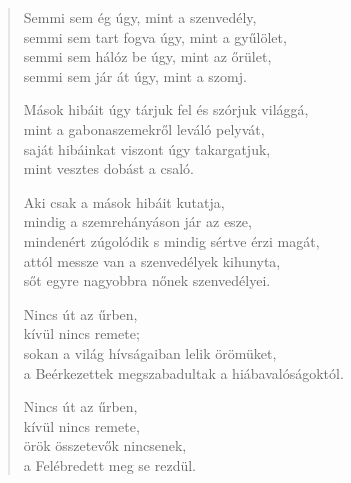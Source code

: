 \begin{verse}
 Semmi sem ég úgy, mint a szenvedély,\\
semmi sem tart fogva úgy, mint a gyűlölet,\\
semmi sem hálóz be úgy, mint az őrület,\\
semmi sem jár át úgy, mint a szomj.

 Mások hibáit úgy tárjuk fel és szórjuk világgá,\\
mint a gabonaszemekről leváló pelyvát,\\
saját hibáinkat viszont úgy takargatjuk,\\
mint vesztes dobást a csaló.

 Aki csak a mások hibáit kutatja,\\
mindig a szemrehányáson jár az esze,\\
mindenért zúgolódik s mindig sértve érzi magát,\\
attól messze van a szenvedélyek kihunyta,\\
sőt egyre nagyobbra nőnek szenvedélyei.

 Nincs út az űrben,\\
kívül nincs remete;\\
sokan a világ hívságaiban lelik örömüket,\\
a Beérkezettek megszabadultak a hiábavalóságoktól.

 Nincs út az űrben,\\
kívül nincs remete,\\
örök összetevők nincsenek,\\
a Felébredett meg se rezdül.

\end{verse}

